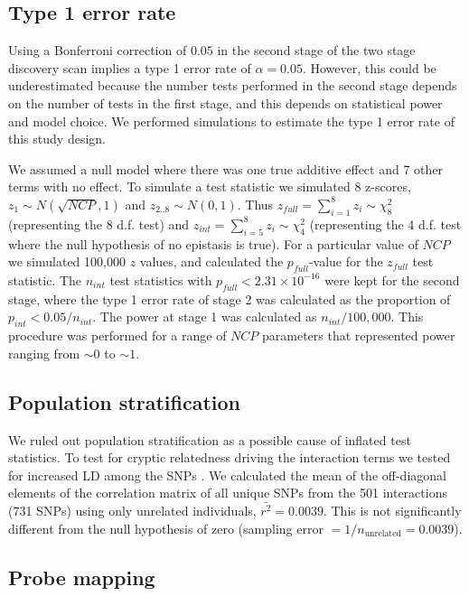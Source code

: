 \documentclass{article}
\begin{document}
\subsection{Type 1 error rate}

Using a Bonferroni correction of $0.05$ in the second stage of the two stage discovery scan implies a type 1 error rate of $\alpha = 0.05$. However, this could be underestimated because the number tests performed in the second stage depends on the number of tests in the first stage, and this depends on statistical power and model choice. We performed simulations to estimate the type 1 error rate of this study design.

We assumed a null model where there was one true additive effect and 7 other terms with no effect. To simulate a test statistic we simulated 8 z-scores, $z_1 \sim N(\sqrt{NCP}, 1)$ and $z_{2..8} \sim N(0,1)$. Thus $z_{full} = \sum^8_{i=1}{z_i} \sim \chi^{2}_{8}$ (representing the 8 d.f. test) and $z_{int} = \sum^8_{i=5}{z_i} \sim \chi^{2}_{4}$ (representing the 4 d.f. test where the null hypothesis of no epistasis is true). For a particular value of $NCP$ we simulated 100,000 $z$ values, and calculated the $p_{full}$-value for the $z_{full}$ test statistic. The $n_{int}$ test statistics with $p_{full} < 2.31 \times 10^{-16}$ were kept for the second stage, where the type 1 error rate of stage 2 was calculated as the proportion of $p_{int} < 0.05 / n_{int}$. The power at stage 1 was calculated as $n_{int} / 100,000$. This procedure was performed for a range of $NCP$ parameters that represented power ranging from $\sim 0$ to $\sim 1$.


\subsection{Population stratification}

We ruled out population stratification as a possible cause of inflated test statistics. To test for cryptic relatedness driving the interaction terms we tested for increased LD among the SNPs \cite{Yang2011}. We calculated the mean of the off-diagonal elements of the correlation matrix of all unique SNPs from the 501 interactions (731 SNPs) using only unrelated individuals, $\bar{r^2} = 0.0039$. This is not significantly different from the null hypothesis of zero (sampling error $= 1/n_{\textrm{unrelated}} = 0.0039$).


\subsection{Probe mapping}
\end{document}

